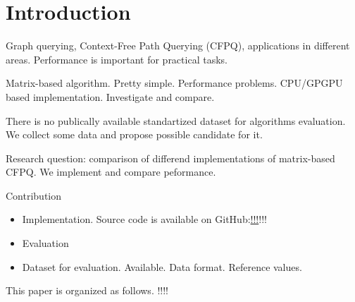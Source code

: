 \section{Introduction}

Graph querying, Context-Free Path Querying (CFPQ), applications in different areas.
Performance is important for practical tasks.

Matrix-based algorithm.
Pretty simple.
Performance problems.
CPU/GPGPU based implementation.
Investigate and compare.

There is no publically available standartized dataset for algorithms evaluation.
We collect some data and propose possible candidate for it. 

Research question: comparison of differend implementations of matrix-based CFPQ.
We implement and compare peformance.


Contribution
\begin{itemize}
\item Implementation. Source code is available on GitHub:\url{!!!}{!!!}
\item Evaluation
\item Dataset for evaluation. Available. Data format. Reference values.
\end{itemize}

This paper is organized as follows. !!!!
